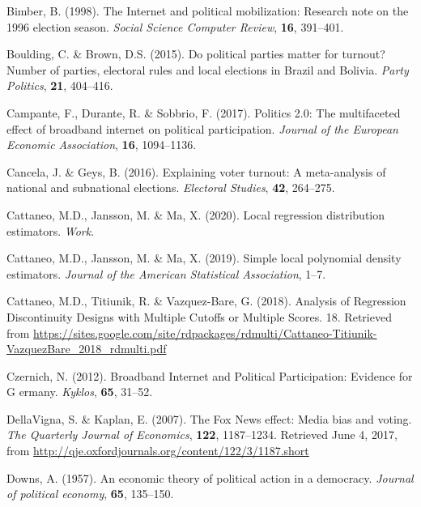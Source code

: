 \documentclass[
  12pt,
]{article}
\begin{document}
\leavevmode\hypertarget{ref-bimber_internet_1998}{}%
Bimber, B. (1998). The Internet and political mobilization: Research
note on the 1996 election season. \emph{Social Science Computer Review},
\textbf{16}, 391--401.

\leavevmode\hypertarget{ref-boulding_political_2015}{}%
Boulding, C. \& Brown, D.S. (2015). Do political parties matter for
turnout? Number of parties, electoral rules and local elections in
Brazil and Bolivia. \emph{Party Politics}, \textbf{21}, 404--416.

\leavevmode\hypertarget{ref-campante_politics_2017}{}%
Campante, F., Durante, R. \& Sobbrio, F. (2017). Politics 2.0: The
multifaceted effect of broadband internet on political participation.
\emph{Journal of the European Economic Association}, \textbf{16},
1094--1136.

\leavevmode\hypertarget{ref-cancela_explaining_2016}{}%
Cancela, J. \& Geys, B. (2016). Explaining voter turnout: A
meta-analysis of national and subnational elections. \emph{Electoral
Studies}, \textbf{42}, 264--275.

\leavevmode\hypertarget{ref-cattaneo_local_2020}{}%
Cattaneo, M.D., Jansson, M. \& Ma, X. (2020). Local regression
distribution estimators. \emph{Work}.

\leavevmode\hypertarget{ref-cattaneo_simple_2019}{}%
Cattaneo, M.D., Jansson, M. \& Ma, X. (2019). Simple local polynomial
density estimators. \emph{Journal of the American Statistical
Association}, 1--7.

\leavevmode\hypertarget{ref-cattaneo_analysis_2018}{}%
Cattaneo, M.D., Titiunik, R. \& Vazquez-Bare, G. (2018). Analysis of
Regression Discontinuity Designs with Multiple Cutoffs or Multiple
Scores. 18. Retrieved from
\url{https://sites.google.com/site/rdpackages/rdmulti/Cattaneo-Titiunik-VazquezBare_2018_rdmulti.pdf}

\leavevmode\hypertarget{ref-czernich_broadband_2012}{}%
Czernich, N. (2012). Broadband Internet and Political Participation:
Evidence for G ermany. \emph{Kyklos}, \textbf{65}, 31--52.

\leavevmode\hypertarget{ref-dellavigna_fox_2007}{}%
DellaVigna, S. \& Kaplan, E. (2007). The Fox News effect: Media bias and
voting. \emph{The Quarterly Journal of Economics}, \textbf{122},
1187--1234. Retrieved June 4, 2017, from
\url{http://qje.oxfordjournals.org/content/122/3/1187.short}

\leavevmode\hypertarget{ref-downs_economic_1957}{}%
Downs, A. (1957). An economic theory of political action in a democracy.
\emph{Journal of political economy}, \textbf{65}, 135--150.
\end{document}
